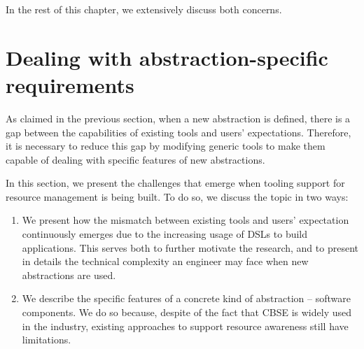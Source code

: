 In the rest of this chapter, we extensively discuss both concerns.

\section{Dealing with abstraction-specific requirements} \label{sec:abstraction-specific-requirements}
As claimed in the previous section, when a new abstraction is defined, there is a gap between the capabilities of existing tools and users' expectations.
Therefore, it is necessary to reduce this gap by modifying generic tools to make them capable of dealing with specific features of new abstractions.

In this section, we present the challenges that emerge when tooling support for resource management is being built.
To do so, we discuss the topic in two ways:

\begin{enumerate}
\item  We present how the mismatch between existing tools and users' expectation continuously emerges due to the increasing usage of DSLs to build applications.
This serves both to further motivate the research, and to present in details the technical complexity an engineer may face when new abstractions are used.

\item We describe the specific features of a concrete kind of abstraction -- software components.
We do so because, despite of the fact that \gls{CBSE} is widely used in the industry, existing approaches to support resource awareness still have limitations.
\end{enumerate}

